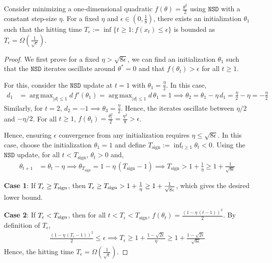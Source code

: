 \documentclass{article}
\newcommand{\tht}{\theta_t}
\newcommand{\thtt}{\theta_{t+1}}
\DeclareMathOperator*{\argmax}{arg\,max}
\newcommand{\NSD}{\texttt{NSD}}
\begin{document}
\begin{proposition}
Consider minimizing a one-dimensional quadratic $f(\theta) = \frac{\theta^2}{2}$ using $\NSD$ with a constant step-size $\eta$. For a fixed $\eta$ and $\epsilon \in \left(0, \frac{1}{8} \right)$, there exists an initialization $\theta_1$ such that the hitting time $T_\epsilon := \inf\{t \geq 1: f(x_t) \leq \epsilon\}$ is bounded as $T_\epsilon = \Omega\left(\frac{1}{\sqrt{\epsilon}}\right)$. 
\label{prop:nsd-lb}
\end{proposition}
\begin{proof}
We first prove for a fixed $\eta > \sqrt{8 \epsilon}$, we can find an initialization $\theta_1$ such that the $\NSD$ iterates oscillate around $\theta^* = 0$ and that $f(\tht) > \epsilon$ for all $t \geq 1$. 

For this, consider the $\NSD$ update at $t = 1$ with $\theta_1 = \frac{\eta}{2}$. In this case, 
\begin{align*}
d_1 &= \argmax_{|d| \leq 1} d \, f'(\theta_1) =  \argmax_{|d| \leq 1} d \, \theta_1 = 1 
\implies \theta_2 = \theta_1 - \eta \, d_1 = \frac{\eta}{2} - \eta = -\frac{\eta}{2}     
\end{align*}
Similarly, for $t = 2$, $d_2 = -1 \implies \theta_3 = \frac{\eta}{2}$. Hence, the iterates oscillate between $\eta/2$ and $-\eta/2$. For all $t \geq 1$, $f(\tht) =  \frac{\tht^2}{2} = \frac{\eta^2}{8} > \epsilon$.  

Hence, ensuring $\epsilon$ convergence from any initialization requires $\eta \leq \sqrt{8 \epsilon}$. In this case, choose the initialization $\theta_1 = 1$ and define $T_\text{sign} := \inf_{t \geq 1} \tht < 0$. Using the $\NSD$ update, for all $t < T_\text{sign}$, $\tht > 0$ and, 
\begin{align*}
\thtt & = \tht - \eta \implies \theta_{T_\text{sign}} = 1 - \eta \, (T_\text{sign} - 1)  \implies T_\text{sign} > 1 + \frac{1}{\eta} \geq 1 + \frac{1}{\sqrt{8 \epsilon}}
\end{align*}

\textbf{Case 1}: If $T_\epsilon \geq T_{\rm sign}$, then
$T_\epsilon \geq T_{\rm sign} > 1+\frac{1}{\eta}
\geq 1+\frac{1}{\sqrt{8\epsilon}}$, which gives the desired lower bound.

\textbf{Case 2}: If $T_\epsilon < T_{\rm sign}$, then for all $t < T_\epsilon < T_\text{sign}$, $f(\tht) = \frac{(1 - \eta \, (t-1))^2}{2}$. By definition of $T_\epsilon$, 
\begin{align*}
\frac{(1 - \eta \, (T_\epsilon-1))^2}{2} \leq \epsilon \implies T_\epsilon \geq 1 + \frac{1 - \sqrt{2 \epsilon}}{\eta} \geq 1 + \frac{1 - \sqrt{2 \epsilon}}{\sqrt{8 \epsilon}}
\end{align*}
Hence, the hitting time $T_\epsilon = \Omega\left(\frac{1}{\sqrt{\epsilon}}\right)$. 
\end{proof}
\end{document}
